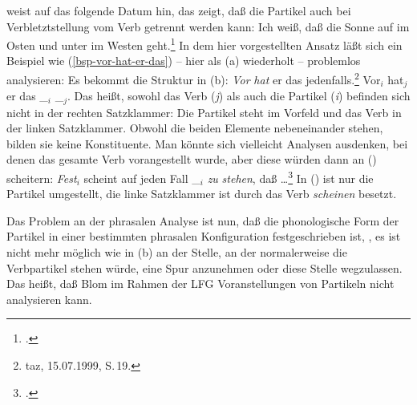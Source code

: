 \citet*[]{Luedeling2001a} weist auf das folgende Datum hin, das zeigt, daß die Partikel
auch bei Verbletztstellung vom Verb getrennt werden kann:
\ea
\label{ex-auf-im-osten-geht}
Ich weiß, daß die Sonne auf              im     Osten und unter               im     Westen geht.\footnote{
        .%
}
\z
In dem hier vorgestellten Ansatz läßt sich ein Beispiel wie (\ref{bsp-vor-hat-er-das})
-- hier als (a) wiederholt -- problemlos analysieren: Es bekommt die Struktur in (b):
\eal
\ex \label{bsp-vor-hat-er-das-zwei}
\emph{Vor} \emph{hat} er das jedenfalls.\footnote{
taz, 15.07.1999, S.\,19.
}
\ex Vor$_i$ hat$_j$ er das \_$_i$ \_$_j$.
\zl
Das heißt, sowohl das Verb (\emph{j}) als auch die Partikel (\emph{i}) befinden
sich nicht in der rechten Satzklammer: Die Partikel steht im Vorfeld und das Verb
in der linken Satzklammer. Obwohl die beiden Elemente nebeneinander stehen, bilden
sie keine Konstituente. Man könnte sich vielleicht Analysen ausdenken, bei denen
das gesamte Verb vorangestellt wurde, aber diese würden dann an () scheitern:
\ea 
\emph{Fest}$_i$ scheint auf jeden Fall \_$_i$ \emph{zu} \emph{stehen}, daß \ldots\footnote{
        .
       }
\z
In () ist nur die Partikel umgestellt, die linke Satzklammer ist durch das Verb \emph{scheinen}
besetzt.

Das Problem an der phrasalen Analyse ist nun, daß die phonologische Form der Partikel in einer bestimmten
phrasalen Konfiguration festgeschrieben ist, \dash, es ist nicht mehr möglich wie in (b)
an der Stelle, an der normalerweise die Verbpartikel stehen würde, eine Spur anzunehmen
oder diese Stelle wegzulassen. Das heißt, daß Blom im Rahmen der LFG Voranstellungen
von Partikeln nicht analysieren kann.

